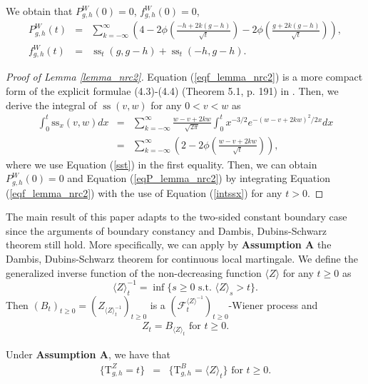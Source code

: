 \documentclass[aop]{imsart}
\theoremstyle{plain}
\theoremstyle{remark}
\newcommand{\Tau}{\mathrm{T}}
\begin{document}
\begin{lemma}
\label{lemma_nrc2} We obtain that $P_{g,h}^W (0)  =  0$, $f_{g,h}^W (0)  =  0$, 
\begin{eqnarray}
\label{eqP_lemma_nrc2} P_{g,h}^W (t) & = &\sum_{k=-\infty}^{\infty}{\left(4-2\phi\left(\frac{-h+2k(g-h)}{\sqrt{t}}\right)-2\phi\left(\frac{g+2k(g-h)}{\sqrt{t}}\right)\right)},\\
\label{eqf_lemma_nrc2} f_{g,h}^W (t) & = & \operatorname{ss}_t\left(g,g-h\right)+\operatorname{ss}_t\left(-h,g-h\right).
\end{eqnarray}
\end{lemma}
\begin{proof}[Proof of Lemma \ref{lemma_nrc2}] Equation (\ref{eqf_lemma_nrc2}) is a more compact form of the explicit formulae (4.3)-(4.4) (Theorem 5.1, p. 191) in \cite{anderson1960modification}. Then, we derive the integral of $\operatorname{ss}(v,w)$ for any $0<v<w$ as
\begin{eqnarray}
\nonumber \int_0^t{\mathrm{ss}_{x}(v, w)dx}&=&\sum_{k=-\infty}^{\infty}\frac{w-v+2kw}{\sqrt{2\pi}}\int_0^t{x^{-3/2}e^{-(w-v+2kw)^{2}/2x}dx}\\ \label{intssx}
&=&\sum_{k=-\infty}^{\infty}\left(2-2 \phi\left(\frac{w-v+2kw}{\sqrt{t}}\right)\right),
\end{eqnarray}
where we use Equation (\ref{sst}) in the first equality. Then, we can obtain $P_{g,h}^W (0)  = 0$ and Equation (\ref{eqP_lemma_nrc2}) by integrating Equation (\ref{eqf_lemma_nrc2}) with the use of Equation (\ref{intssx}) for any $t>0$.
\end{proof}
\noindent The main result of this paper adapts to the two-sided constant boundary case since the arguments of boundary constancy and Dambis, Dubins-Schwarz theorem still hold. More specifically, we can apply by \textbf{Assumption A} the Dambis, Dubins-Schwarz theorem for continuous local martingale. We define the generalized inverse function of the non-decreasing function $\langle Z\rangle$ for any $t \geq0$ as 
$$\langle Z\rangle_{t}^{-1}=\inf\{s \geq 0 \text{ s.t. }\langle Z\rangle_{s}>t\}.$$ 
Then $(B_{t})_{t\geq 0}=(Z_{\langle Z\rangle_{t}^{-1}})_{t\geq 0}$ is a $({\mathcal {F}}_t^{\langle Z\rangle^{-1}})_{t\geq 0}$-Wiener process and 
\begin{eqnarray}
\label{proof230110_nrc2}
Z_{t}=B_{\langle Z\rangle_{t}} \text{ for } t \geq 0.
\end{eqnarray}
\begin{lemma}
\label{lemmaDDS_nrc2}
Under \textbf{Assumption A}, we have that
\begin{eqnarray}
\label{eq_lemmaDDS_nrc2}
\big\{ \Tau_{g,h}^Z =t \big\} & = & \big\{ \Tau_{g,h}^B = \langle Z\rangle_{t} \big\} \text{ for } t \geq 0.
\end{eqnarray}
\end{lemma}
\end{document}
